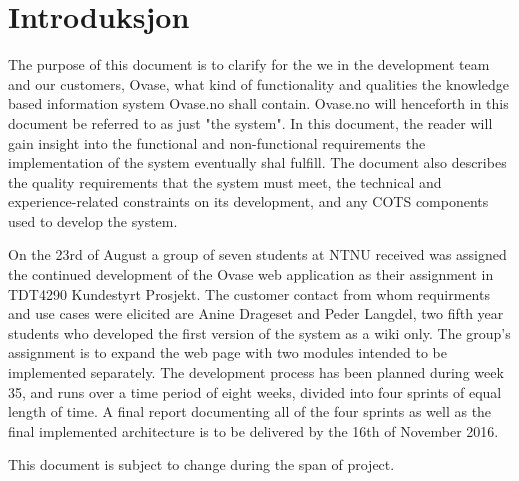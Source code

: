 \chapter{Introduksjon}
\setlength{\parindent}{2ex}
The purpose of this document is to clarify for the we in the development team and our customers, Ovase, what kind of functionality and qualities the knowledge based information system Ovase.no shall contain. Ovase.no will henceforth in this document be referred to as just "the system". In this document, the reader will gain insight into the functional and non-functional requirements the implementation of the system eventually shal fulfill. The document also describes the quality requirements that the system must meet, the technical and experience-related constraints on its development, and any COTS components used to develop the system. \par
On the 23rd of August a group of seven students at NTNU received was assigned the continued development of the Ovase web application as their assignment in TDT4290 Kundestyrt Prosjekt. The customer contact from whom requirments and use cases were elicited are Anine Drageset and Peder Langdel, two fifth year students who developed the first version of the system as a wiki only. The group's assignment is to expand the web page with two modules intended to be implemented separately. The development process has been planned during week 35, and runs over a time period of eight weeks, divided into four sprints of equal length of time. A final report documenting all of the four sprints as well as the final implemented architecture is to be delivered by the 16th of November 2016. \par
This document is subject to change during the span of project.


